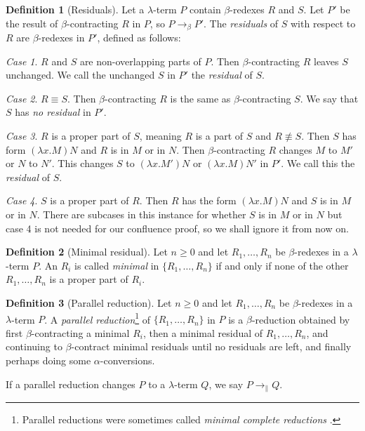 \documentclass[a4paper, 11pt]{article}
\theoremstyle{plain}
\theoremstyle{definition}
\newtheorem{defn}{Definition}[section]
\theoremstyle{remark}
\newtheorem{case}{Case}
\newcommand\bcon{\mathrel{\rightarrow_\beta}}
\newcommand\pred{\mathrel{\rightarrow_\parallel}}
\begin{document}
\begin{defn}[Residuals]
Let a $\lambda$-term $P$ contain $\beta$-redexes $R$ and $S$. Let $P'$ be the result of $\beta$-contracting $R$ in $P$, so $P \bcon P'$. The \textit{residuals} of $S$ with respect to $R$ are $\beta$-redexes in $P'$, defined as follows:
%
\begin{case}
$R$ and $S$ are non-overlapping parts of $P$. Then $\beta$-contracting $R$ leaves $S$ unchanged. We call the unchanged $S$ in $P'$ the \textit{residual} of $S$.
\end{case}
%
\begin{case}
$R \equiv S$. Then $\beta$-contracting $R$ is the same as $\beta$-contracting $S$. We say that $S$ has \textit{no residual} in $P'$.
\end{case}
%
\begin{case}
$R$ is a proper part of $S$, meaning $R$ is a part of $S$ and $R \not\equiv S$. Then $S$ has form $(\lambda x . M) N$ and $R$ is in $M$ or in $N$. Then $\beta$-contracting $R$ changes $M$ to $M'$ or $N$ to $N'$. This changes $S$ to $(\lambda x . M') N$ or $(\lambda x . M) N'$ in $P'$. We call this the \textit{residual} of $S$.
\end{case}
%
\begin{case}
$S$ is a proper part of $R$. Then $R$ has the form $(\lambda x . M) N$ and $S$ is in $M$ or in $N$. There are subcases in this instance for whether $S$ is in $M$ or in $N$ \parencite[pp.~284--285]{hindley-seldin-2008-lambda-calculus-and-combinators} but case 4 is not needed for our confluence proof, so we shall ignore it from now on.
\end{case}
\end{defn}

\begin{defn}[Minimal residual]
Let $n \ge 0$ and let $R_1, \dotsc, R_n$ be $\beta$-redexes in a $\lambda$-term $P$. An $R_i$ is called \textit{minimal} in $\{R_1, \dotsc, R_n\}$ if and only if none of the other $R_1, \dotsc, R_n$ is a proper part of $R_i$.
\end{defn}

\begin{defn}[Parallel reduction]
Let $n \ge 0$ and let $R_1, \dotsc, R_n$ be $\beta$-redexes in a $\lambda$-term $P$. A \textit{parallel reduction}\footnote{Parallel reductions were sometimes called \textit{minimal complete reductions} \parencite[p.~315]{hindley-seldin-1986-introduction-to-combinators-and-lambda-calculus}.} of $\{R_1, \dotsc, R_n\}$ in $P$ is a $\beta$-reduction obtained by first $\beta$-contracting a minimal $R_i$, then a minimal residual of $R_1, \dotsc, R_n$, and continuing to $\beta$-contract minimal residuals until no residuals are left, and finally perhaps doing some $\alpha$-conversions.

If a parallel reduction changes $P$ to a $\lambda$-term $Q$, we say $P \pred Q$.
\end{defn}
\end{document}
